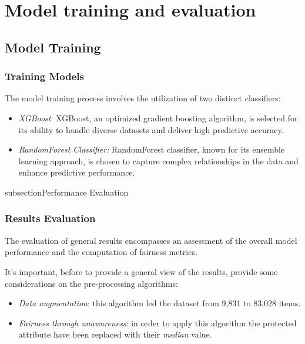 \section{Model training and evaluation}
\label{section:val_mt_eval}

\subsection{Model Training}

\subsubsection{Training Models}

The model training process involves the utilization of two distinct classifiers:

\begin{itemize}

    \item \emph{XGBoost}: XGBoost, an optimized gradient boosting algorithm, is selected for its ability to handle diverse datasets and deliver high predictive accuracy.

    \item \emph{RandomForest Classifier:} RandomForest classifier, known for its ensemble learning approach, is chosen to capture complex relationships in the data and enhance predictive performance.

\end{itemize}

subsection{Performance Evaluation}

\subsubsection{Results Evaluation}

The evaluation of general results encompasses an assessment of the overall model performance and the computation of fairness metrics.

It's important, before to provide a general view of the results, provide some considerations on the pre-processing algorithms:

\begin{itemize}
    \item \emph{Data augmentation}: this algorithm led the dataset from 9,831 to 83,028 items.
    \item \emph{Fairness through unawareness}: in order to apply this algorithm the protected attribute have been replaced with their \emph{median} value.
\end{itemize}

